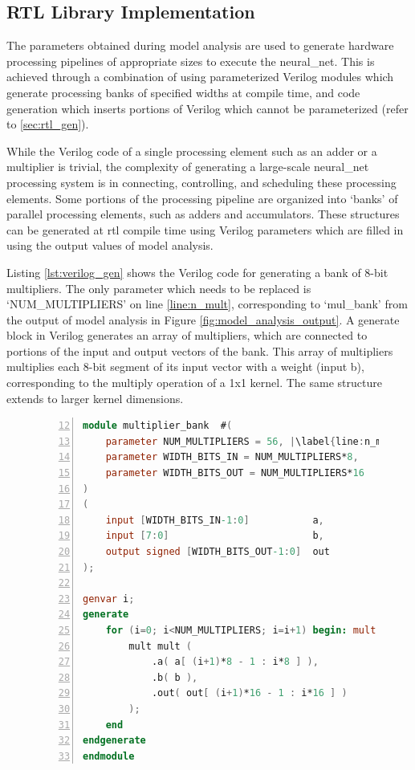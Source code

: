 \documentclass{uw-ece-wkrpt}
\begin{document}
\subsection{RTL Library Implementation}

The parameters obtained during model analysis are used to generate hardware processing pipelines of appropriate sizes to execute the \gls{neural_net}. This is achieved through a combination of using parameterized Verilog modules which generate processing banks of specified widths at compile time, and code generation which inserts portions of Verilog which cannot be parameterized (refer to \ref{sec:rtl_gen}).

While the Verilog code of a single processing element such as an adder or a multiplier is trivial, the complexity of generating a large-scale \gls{neural_net} processing system is in connecting, controlling, and scheduling these processing elements. Some portions of the processing pipeline are organized into `banks' of parallel processing elements, such as adders and accumulators. These structures can be generated at \gls{rtl} compile time using Verilog parameters which are filled in using the output values of model analysis.

Listing \ref{lst:verilog_gen} shows the Verilog code for generating a bank of 8-bit multipliers. The only parameter which needs to be replaced is `NUM\_MULTIPLIERS' on line \ref{line:n_mult}, corresponding to `mul\_bank' from the output of model analysis in Figure \ref{fig:model_analysis_output}. A generate block in Verilog generates an array of multipliers, which are connected to portions of the input and output vectors of the bank. This array of multipliers multiplies each 8-bit segment of its input vector with a \gls{weight} (input b), corresponding to the multiply operation of a 1x1 \gls{kernel}. The same structure extends to larger \gls{kernel} dimensions.

\begin{figure}
\centering
\begin{lstlisting}[caption={Verilog compile-time generation}, label=lst:verilog_gen, language=Verilog, escapechar=|, numbers=left, firstnumber=12]
module multiplier_bank  #(
    parameter NUM_MULTIPLIERS = 56, |\label{line:n_mult}|
    parameter WIDTH_BITS_IN = NUM_MULTIPLIERS*8,
    parameter WIDTH_BITS_OUT = NUM_MULTIPLIERS*16
)
(
    input [WIDTH_BITS_IN-1:0]           a,
    input [7:0]                         b,
    output signed [WIDTH_BITS_OUT-1:0]  out
);

genvar i;
generate
    for (i=0; i<NUM_MULTIPLIERS; i=i+1) begin: mult
        mult mult (
            .a( a[ (i+1)*8 - 1 : i*8 ] ),
            .b( b ),
            .out( out[ (i+1)*16 - 1 : i*16 ] )
        );
    end
endgenerate
endmodule
\end{lstlisting}
\end{figure}
\end{document}
